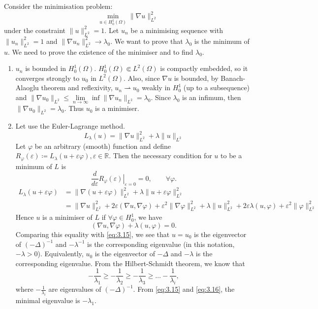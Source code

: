 \documentclass{report}
\begin{document}
Consider the minimisation problem:
\[
    \min\limits_{u \in H^{1}_{0}(\Omega)}\|\nabla u\|_{L^{2}}^{2}
\]
under the constraint \(\|u\|_{L^{2}}^{2} = 1\). Let \(u_{n}\) be a minimising sequence with \(\|u_{n}\|_{L^{2}}^{2} = 1\) and \(\|\nabla u_{n}\|_{L^{2}}^{2} \to \lambda_{0}\). We want to prove that \(\lambda_{0}\) is the minimum of \(u\). We need to prove the existence of the minimiser and to find \(\lambda_{0}\).

\begin{enumerate}
    \item \(u_{n}\) is bounded in \(H^{1}_{0}(\Omega)\). \(H^{1}_{0}(\Omega) \Subset L^{2}(\Omega)\) is compactly embedded, so it converges strongly to \(u_{0}\) in \(L^{2}(\Omega)\). Also, since \(\nabla u\) is bounded, by Banach-Alaoglu theorem and reflexivity, \(u_{n} \rightharpoonup u_{0}\) weakly in \(H^{1}_{0}\) (up to a subsequence) and \(\|\nabla u_{0}\|_{L^{2}} \leq \lim\limits_{n \to \infty} \inf \|\nabla u_{n}\|_{L^{2}} = \lambda_{0}\). Since \(\lambda_{0}\) is an infimum, then \(\|\nabla u_{0}\|_{L^{2}} = \lambda_{0}\). Thus \(u_{0}\) is a minimiser.
    \item Let use the Euler-Lagrange method.
    \[
        L_{\lambda}(u) = \|\nabla u\|_{L^{2}}^{2} + \lambda\|u\|_{L^{2}}
    \]
    Let \(\varphi\) be an arbitrary (smooth) function and define \(R_{\varphi}(\varepsilon) \coloneqq L_{\lambda}(u + \varepsilon\varphi), \varepsilon \in \mathbb{R}\). Then the necessary condition for \(u\) to be a minimum of \(L\) is
    \[
        \frac{d}{d\varepsilon} \left. R_{\varphi}(\varepsilon) \right|_{\varepsilon = 0} = 0, \qquad \forall \varphi.
    \]
    \begin{align*}
        L_{\lambda}(u + \varepsilon\varphi) &= \|\nabla (u + \varepsilon\varphi)\|_{L^{2}}^{2} + \lambda\|u + \varepsilon\varphi\|_{L^{2}}^{2} \\
        &= \|\nabla u\|_{L^{2}}^{2} + 2\varepsilon(\nabla u, \nabla \varphi) + \varepsilon^{2}\|\nabla \varphi\|_{L^{2}}^2 + \lambda\|u\|_{L^{2}}^{2} + 2\varepsilon \lambda(u, \varphi) + \varepsilon^{2}\|\varphi\|_{L^{2}}^{2}
    \end{align*}
    Hence \(u\) is a minimiser of \(L\) if \(\forall \varphi \in H^{1}_{0}\), we have 
    \[
       (\nabla u, \nabla \varphi) + \lambda(u, \varphi) = 0.
    \]
    Comparing this equality with \ref{eq:3.15}, we see that \(u = u_{0}\) is the eigenvector of \((-\Delta)^{-1}\) and \(-\lambda^{-1}\) is the corresponding eigenvalue (in this notation, \(-\lambda > 0\)). Equivalently, \(u_{0}\) is the eigenvector of \(-\Delta\) and \(-\lambda\) is the corresponding eigenvalue. From the Hilbert-Schmidt theorem, we know that
    \begin{equation}\label{eq:3.16}
        -\frac{1}{\lambda_{1}} \geq -\frac{1}{\lambda_{2}} \geq -\frac{1}{\lambda_{3}} \geq \dots -\frac{1}{\lambda_{i}},
    \end{equation}
    where \(-\frac{1}{\lambda_{i}}\) are eigenvalues of \((-\Delta)^{-1}\). From \ref{eq:3.15} and \ref{eq:3.16}, the minimal eigenvalue is \(-\lambda_{1}\).
    

\end{enumerate}
\end{document}
